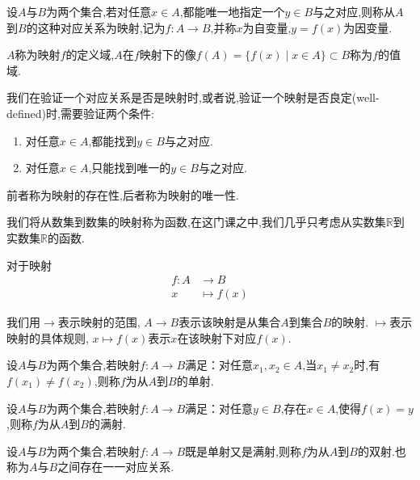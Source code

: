 \begin{definition}
    [映射] 设$A$与$B$为两个集合,若对任意$x\in A$,都能唯一地指定一个$y\in B$与之对应,则称从$A$到$B$的这种对应关系为映射,记为$f:A\to B$,并称$x$为自变量,$y=f(x)$为因变量.

    $A$称为映射$f$的定义域,$A$在$f$映射下的像$f(A)=\{ f(x) \mid x \in A \} \subset B$称为$f$的值域.
\end{definition}

我们在验证一个对应关系是否是映射时,或者说,验证一个映射是否良定(well-defined)时,需要验证两个条件:
\begin{enumerate}[(1)]
    \item 对任意$x\in A$,都能找到$y\in B$与之对应.
    \item 对任意$x\in A$,只能找到唯一的$y\in B$与之对应.
\end{enumerate}
前者称为映射的存在性,后者称为映射的唯一性.

我们将从数集到数集的映射称为函数,在这门课之中,我们几乎只考虑从实数集$\mathbb{R}$到实数集$\mathbb{R}$的函数.

\begin{notation*}
    对于映射\begin{align*}
        f: A & \to B        \\
        x    & \mapsto f(x)
    \end{align*}

    我们用$\to$表示映射的范围, $A \to B$表示该映射是从集合$A$到集合$B$的映射. $\mapsto$表示映射的具体规则, $x \mapsto f(x)$表示$x$在该映射下对应$f(x)$.
\end{notation*}

\begin{definition}
    [单射] 设$A$与$B$为两个集合,若映射$f:A\to B$满足：对任意$x_1,x_2\in A$,当$x_1\neq x_2$时,有$f(x_1)\neq f(x_2)$,则称$f$为从$A$到$B$的单射.
\end{definition}

\begin{definition}
    [满射] 设$A$与$B$为两个集合,若映射$f:A\to B$满足：对任意$y\in B$,存在$x\in A$,使得$f(x)=y$,则称$f$为从$A$到$B$的满射.
\end{definition}

\begin{definition}
    [双射] 设$A$与$B$为两个集合,若映射$f:A\to B$既是单射又是满射,则称$f$为从$A$到$B$的双射.也称为$A$与$B$之间存在一一对应关系.
\end{definition}


